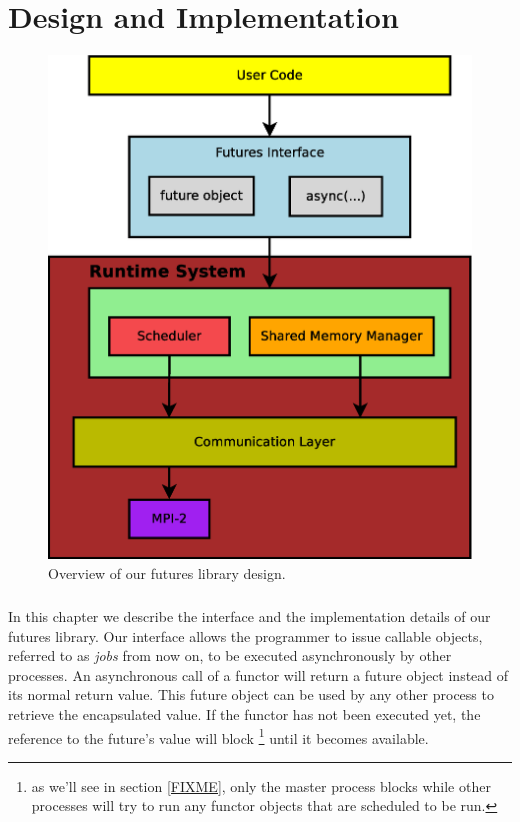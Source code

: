 \chapter{Design and Implementation}
\label{chap:implementation}

\begin{figure}[!ht]
\center
\includegraphics[width=0.7\columnwidth]{figures/system_overview}
\caption{Overview of our futures library design.}
\label{fig:system_overview}
\end{figure}

\paragraph{}
	In this chapter we describe the interface and the implementation details of our futures library.
Our interface allows the programmer to issue callable objects, referred to as \emph{jobs} from now on,
 to be executed asynchronously
by other processes.  An asynchronous call of a functor will return a future object instead of its normal 
return value.  This future object can be used by any other process to retrieve the encapsulated value.  If
the functor has not been executed yet, the reference to the future's value will block \footnote{
as we'll see in section \ref{FIXME}, only the master process blocks while other processes will try to 
run any functor objects that are scheduled to be run.}
until it becomes available.  
 
